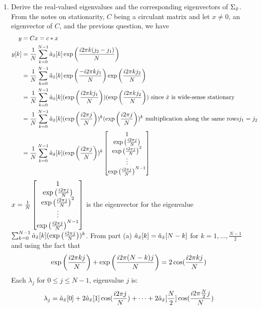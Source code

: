 \documentclass[12pt,twoside]{article}
\begin{document}
\begin{enumerate}
\begin{enumerate}
 
  \item Derive the real-valued eigenvalues and the corresponding eigenvectors of $\Sigma_{\tilde{  x }}$.\\
  From the notes on stationarity, $C$ being a circulant matrix and let $x \neq 0$, an eigenvector of $C$, and the previous question, we have
  \begin{align*}
  					y	&= C x =	c * x \\
					y[k]	&= \frac{1}{N}\sum_{k=0}^{N-1} \hat{a}_{\tilde{  x }}[k] \exp\left( \frac{i2 \pi k (j_2-j_1)}{N} \right) \\
						&=  \frac{1}{N}\sum_{k=0}^{N-1} \hat{a}_{\tilde{  x }}[k]  \exp\left( \frac{-i2 \pi k j_1}{N} \right)  \exp\left( \frac{i2 \pi k j_2}{N} \right) \\
						&= \frac{1}{N}\sum_{k=0}^{N-1} \hat{a}_{\tilde{  x }}[k] ( \exp\left( \frac{i2 \pi k j_1}{N} \right) )  (\exp\left( \frac{i2 \pi k j_2}{N} \right))  \text{ since } \tilde{  x } \text{ is wide-sense stationary}\\
						&= \frac{1}{N}\sum_{k=0}^{N-1} \hat{a}_{\tilde{  x }}[k] ( \exp\left( \frac{i2 \pi j}{N} \right) )^k    ( \exp\left( \frac{i2 \pi j}{N} \right) )^k  \text{ multiplication along the same rows} j_1 = j_2\\
						&=  \frac{1}{N}\sum_{k=0}^{N-1} \hat{a}_{\tilde{  x }}[k] ( \exp\left( \frac{i2 \pi j}{N} \right) )^k  \begin{bmatrix} 1 \\  \exp\left( \frac{i2 \pi j}{N} \right)  \\  \exp\left( \frac{i2 \pi j}{N} \right)^2 \\ \vdots \\  \exp\left( \frac{i2 \pi j}{N} \right)^{N-1} \end{bmatrix}\\
  \end{align*}
  $x= \frac{1}{N} \begin{bmatrix} 1 \\  \exp\left( \frac{i2 \pi j}{N} \right)  \\  \exp\left( \frac{i2 \pi j}{N} \right)^2 \\ \vdots \\  \exp\left( \frac{i2 \pi j}{N} \right)^{N-1} \end{bmatrix}$ is the eigenvector for the eigenvalue $\sum_{k=0}^{N-1} \hat{a}_{\tilde{  x }}[k] ( \exp\left( \frac{i2 \pi j}{N} \right) )^k $.
  From part (a)  $\hat{a}_{\tilde{  x }}[k] = \hat{a}_{\tilde{  x }}[N-k]$ for $k=1,\ldots,\frac{N-1}{2}$ and using the fact that 
  $$
  \exp\left( \frac{i2 \pi k j}{N} \right) +  \exp\left( \frac{i2 \pi (N-k) j}{N} \right) = 2 \cos (\frac{i2 \pi k j}{N})
  $$
  Each $\lambda_j$ for $0 \le j \le N-1$, eigenvalue $j$ is:
  $$
  	\lambda_j = \hat{a}_{\tilde{  x }}[0] +  2 \hat{a}_{\tilde{  x }}[1] \cos (\frac{i2 \pi j}{N})+ \cdots +   2 \hat{a}_{\tilde{  x }}[\frac{N}{2}] \cos (\frac{i2 \pi \frac{N}{2} j}{N})
  $$
  

\end{enumerate}
\end{enumerate}
\end{document}
